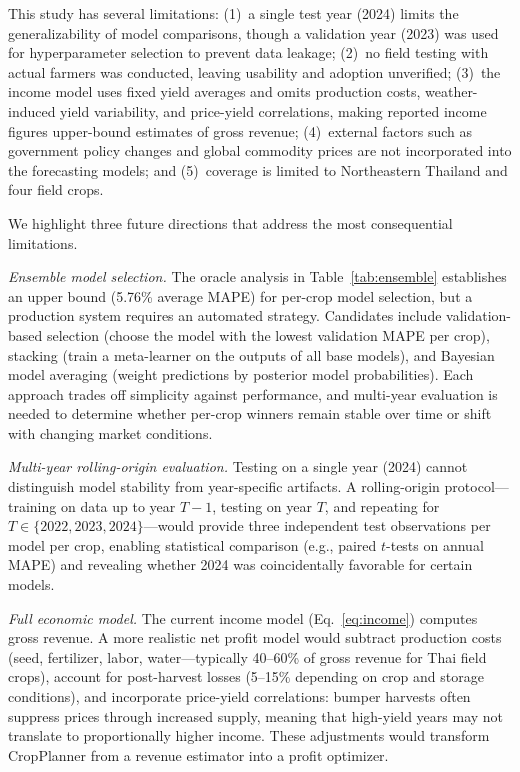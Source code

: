\documentclass[journal]{IEEEtran}
\begin{document}
This study has several limitations: (1)~a single test year (2024) limits the generalizability of model comparisons, though a validation year (2023) was used for hyperparameter selection to prevent data leakage; (2)~no field testing with actual farmers was conducted, leaving usability and adoption unverified; (3)~the income model uses fixed yield averages and omits production costs, weather-induced yield variability, and price-yield correlations, making reported income figures upper-bound estimates of gross revenue; (4)~external factors such as government policy changes and global commodity prices are not incorporated into the forecasting models; and (5)~coverage is limited to Northeastern Thailand and four field crops.

We highlight three future directions that address the most consequential limitations.

\textit{Ensemble model selection.} The oracle analysis in Table~\ref{tab:ensemble} establishes an upper bound (5.76\% average MAPE) for per-crop model selection, but a production system requires an automated strategy. Candidates include validation-based selection (choose the model with the lowest validation MAPE per crop), stacking (train a meta-learner on the outputs of all base models), and Bayesian model averaging (weight predictions by posterior model probabilities). Each approach trades off simplicity against performance, and multi-year evaluation is needed to determine whether per-crop winners remain stable over time or shift with changing market conditions.

\textit{Multi-year rolling-origin evaluation.} Testing on a single year (2024) cannot distinguish model stability from year-specific artifacts. A rolling-origin protocol---training on data up to year $T{-}1$, testing on year $T$, and repeating for $T \in \{2022, 2023, 2024\}$---would provide three independent test observations per model per crop, enabling statistical comparison (e.g., paired $t$-tests on annual MAPE) and revealing whether 2024 was coincidentally favorable for certain models.

\textit{Full economic model.} The current income model (Eq.~\ref{eq:income}) computes gross revenue. A more realistic net profit model would subtract production costs (seed, fertilizer, labor, water---typically 40--60\% of gross revenue for Thai field crops), account for post-harvest losses (5--15\% depending on crop and storage conditions), and incorporate price-yield correlations: bumper harvests often suppress prices through increased supply, meaning that high-yield years may not translate to proportionally higher income. These adjustments would transform CropPlanner from a revenue estimator into a profit optimizer.
\end{document}
